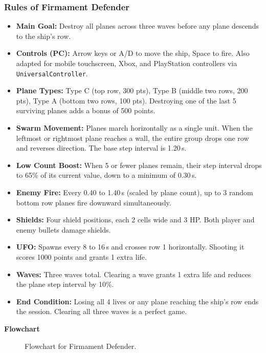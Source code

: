 \documentclass[12pt,letterpaper]{article}
\begin{document}
\subsubsection{Rules of Firmament Defender}
\begin{itemize}
  \item \textbf{Main Goal:} Destroy all planes across three waves before any plane descends to the ship's row.
  \item \textbf{Controls (PC):} Arrow keys or A/D to move the ship, Space to fire. Also adapted for mobile touchscreen, Xbox, and PlayStation controllers via \texttt{UniversalController}.
  \item \textbf{Plane Types:} Type C (top row, 300 pts), Type B (middle two rows, 200 pts), Type A (bottom two rows, 100 pts). Destroying one of the last 5 surviving planes adds a bonus of 500 points.
  \item \textbf{Swarm Movement:} Planes march horizontally as a single unit. When the leftmost or rightmost plane reaches a wall, the entire group drops one row and reverses direction. The base step interval is 1.20\,s.
  \item \textbf{Low Count Boost:} When 5 or fewer planes remain, their step interval drops to 65\% of its current value, down to a minimum of 0.30\,s.
  \item \textbf{Enemy Fire:} Every 0.40 to 1.40\,s (scaled by plane count), up to 3 random bottom row planes fire downward simultaneously.
  \item \textbf{Shields:} Four shield positions, each 2 cells wide and 3 HP. Both player and enemy bullets damage shields.
  \item \textbf{UFO:} Spawns every 8 to 16\,s and crosses row 1 horizontally. Shooting it scores 1000 points and grants 1 extra life.
  \item \textbf{Waves:} Three waves total. Clearing a wave grants 1 extra life and reduces the plane step interval by 10\%.
  \item \textbf{End Condition:} Losing all 4 lives or any plane reaching the ship's row ends the session. Clearing all three waves is a perfect game.
\end{itemize}

\textbf{Flowchart}
\begin{figure}[H]
  \centering
  
  \caption{Flowchart for Firmament Defender.}
  \label{fig:firmamentdefender_flow}
\end{figure}
\end{document}
